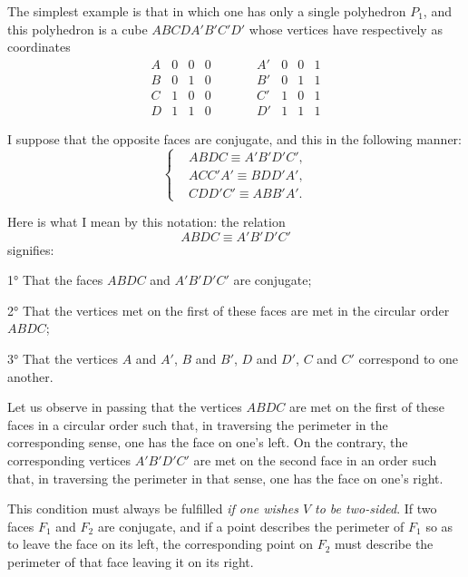 \documentclass{article}
\begin{document}
The simplest example is that in which one has only a single polyhedron $P_{1}$, and this polyhedron is a cube $ABCDA'B'C'D'$ whose vertices have respectively as coordinates
\[ \begin{matrix} A & 0 & 0 & 0 & \qquad & A' & 0 & 0 & 1 \\[1ex] B & 0 & 1 & 0 & \qquad & B' & 0 & 1 & 1 \\[1ex] C & 1 & 0 & 0 & \qquad & C' & 1 & 0 & 1 \\[1ex] D & 1 & 1 & 0 & \qquad & D' & 1 & 1 & 1 \end{matrix} \]

I suppose that the opposite faces are conjugate, and this in the following manner:
\[ \left\{ \begin{aligned} &ABDC \equiv A'B'D'C',\\ &ACC'A' \equiv BDD'A',\\ &CDD'C' \equiv ABB'A'. \end{aligned} \right. \tag{1} \]

Here is what I mean by this notation: the relation
\[ ABDC \equiv A'B'D'C' \]
signifies:

1° That the faces $ABDC$ and $A'B'D'C'$ are conjugate;

2° That the vertices met on the first of these faces are met in the circular order $ABDC$;

3° That the vertices $A$ and $A'$, $B$ and $B'$, $D$ and $D'$, $C$ and $C'$ correspond to one another.

Let us observe in passing that the vertices $ABDC$ are met on the first of these faces in a circular order such that, in traversing the perimeter in the corresponding sense, one has the face on one's left. On the contrary, the corresponding vertices $A'B'D'C'$ are met on the second face in an order such that, in traversing the perimeter in that sense, one has the face on one's right.

This condition must always be fulfilled \emph{if one wishes $V$ to be two-sided}. If two faces $F_{1}$ and $F_{2}$ are conjugate, and if a point describes the perimeter of $F_{1}$ so as to leave the face on its left, the corresponding point on $F_{2}$ must describe the perimeter of that face leaving it on its right.
\end{document}
